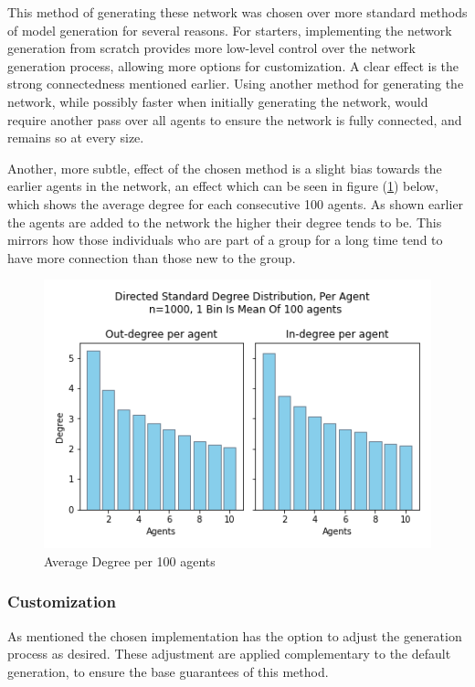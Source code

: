 \documentclass{article}
\begin{document}
This method of generating these network was chosen over more standard methods of model generation for several reasons. For starters, implementing the network generation from scratch provides more low-level control over the network generation process, allowing more options for customization. A clear effect is the strong connectedness mentioned earlier. Using another method for generating the network, while possibly faster when initially generating the network, would require another pass over all agents to ensure the network is fully connected, and remains so at every size. 

Another, more subtle, effect of the chosen method is a slight bias towards the earlier agents in the network, an effect which can be seen in figure (\ref{degree:agent}) below, which shows the average degree for each consecutive 100 agents. As shown earlier the agents are added to the network the higher their degree tends to be. This mirrors how those individuals who are part of a group for a long time tend to have more connection than those new to the group.

\begin{center}
    \begin{figure}[!htbp]
        \centering
        \includegraphics[width=.8\textwidth]{ThesisKI/Images/DirectedStandardPerAgent.png}
        \caption{Average Degree per 100 agents}
        \label{degree:agent}
    \end{figure}
\end{center}
\newpage
\subsubsection{Customization}

As mentioned the chosen implementation has the option to adjust the generation process as desired. These adjustment are applied complementary to the default generation, to ensure the base guarantees of this method. \newline
\end{document}
